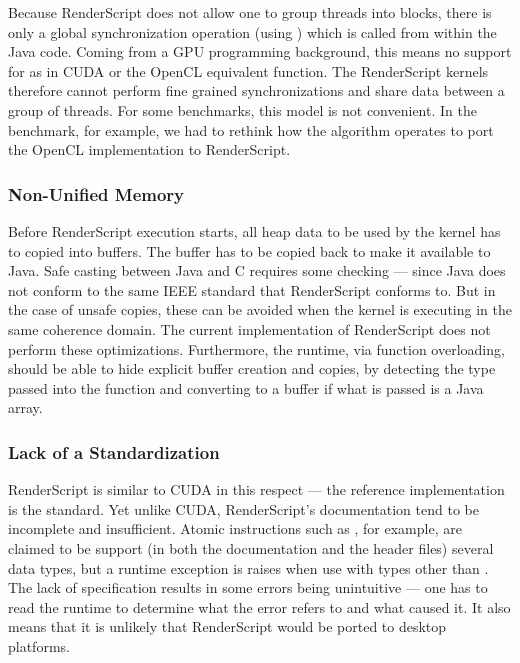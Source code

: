 Because RenderScript does not allow one to group threads into blocks, there is only a global synchronization operation
 (using )  which is called from within the Java code.
Coming from a GPU programming background, this means no support for  as in CUDA or the OpenCL
equivalent  function.
The RenderScript kernels therefore cannot perform fine grained synchronizations and share data between a group of threads.
For some benchmarks, this model is not convenient.
In the  benchmark, for example, we had to rethink how the algorithm operates to port 
  the OpenCL implementation to RenderScript.


\subsubsection{Non-Unified Memory}

Before RenderScript execution starts, all
heap data to be used by the kernel has to copied into  buffers.
The buffer has to be copied back to make it available to Java.
Safe casting between Java and C requires some checking --- since Java does not 
  conform to the same IEEE standard that RenderScript conforms to.
But in the case of unsafe copies, these can be avoided when the kernel is
  executing in the same coherence domain.
The current implementation of RenderScript does not perform these optimizations.
Furthermore, the runtime, via function overloading, should be able to hide 
  explicit buffer creation and copies, by detecting the type passed into the function
  and converting to a  buffer if what is passed is a Java array.

\subsubsection{Lack of a Standardization}

RenderScript is similar to CUDA in this respect --- the reference implementation
  is the standard.
Yet unlike CUDA, RenderScript's documentation tend to be incomplete and insufficient.
Atomic instructions such as , for example, are claimed to be support 
(in both the documentation and the header files) several data types, but a 
runtime exception is raises when use with types other than .
The lack of specification results in some errors being unintuitive --- one has to 
  read the runtime to determine what the error refers to and what caused it.
It also means that it is unlikely that RenderScript would be 
  ported to desktop platforms.


